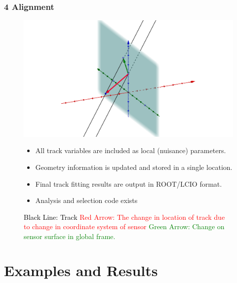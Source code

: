 \documentclass{beamer}
\begin{document}
\begin{frame}
\frametitle{\textbf{4} Alignment}
\begin{figure}
\includegraphics[width=0.6\linewidth]{pics/alignBigger.png}
\caption{\tiny{
\textcolor{black}{Black Line: Track} \newline
\textcolor{red}{Red Arrow: The change in location of track due to change in coordinate system of sensor}\newline
\textcolor{green}{Green Arrow: Change on sensor surface in global frame. } 
}
}
\begin{itemize}
\item All track variables are included as local (nuisance) parameters. 
\item Geometry information is updated and stored in a single location.
\item Final track fitting results are output in ROOT/LCIO format.
\item Analysis and selection code exists
\end{itemize}
\label{fig:TC1}
\end{figure}
\end{frame}

\section{Examples and Results}
\end{document}

